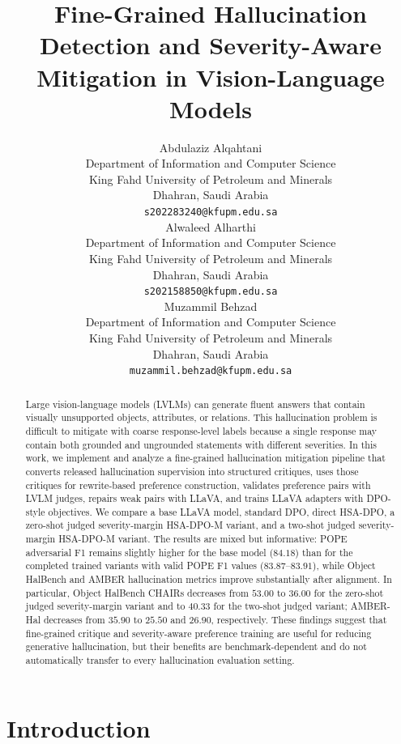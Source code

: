 \documentclass{article}
\title{Fine-Grained Hallucination Detection and Severity-Aware Mitigation in Vision-Language Models}
\author{%
  Abdulaziz Alqahtani\\
  Department of Information and Computer Science\\
  King Fahd University of Petroleum and Minerals\\
  Dhahran, Saudi Arabia\\
  \texttt{s202283240@kfupm.edu.sa}\\
  \And
  Alwaleed Alharthi\\
  Department of Information and Computer Science\\
  King Fahd University of Petroleum and Minerals\\
  Dhahran, Saudi Arabia\\
  \texttt{s202158850@kfupm.edu.sa}\\
  \And
  Muzammil Behzad\\
  Department of Information and Computer Science\\
  King Fahd University of Petroleum and Minerals\\
  Dhahran, Saudi Arabia\\
  \texttt{muzammil.behzad@kfupm.edu.sa}\\
}
\begin{document}
\maketitle

\begin{abstract}
Large vision-language models (LVLMs) can generate fluent answers that contain visually unsupported objects, attributes, or relations. This hallucination problem is difficult to mitigate with coarse response-level labels because a single response may contain both grounded and ungrounded statements with different severities. In this work, we implement and analyze a fine-grained hallucination mitigation pipeline that converts released hallucination supervision into structured critiques, uses those critiques for rewrite-based preference construction, validates preference pairs with LVLM judges, repairs weak pairs with LLaVA, and trains LLaVA adapters with DPO-style objectives. We compare a base LLaVA model, standard DPO, direct HSA-DPO, a zero-shot judged severity-margin HSA-DPO-M variant, and a two-shot judged severity-margin HSA-DPO-M variant. The results are mixed but informative: POPE adversarial F1 remains slightly higher for the base model ($84.18$) than for the completed trained variants with valid POPE F1 values ($83.87$--$83.91$), while Object HalBench and AMBER hallucination metrics improve substantially after alignment. In particular, Object HalBench CHAIRs decreases from $53.00$ to $36.00$ for the zero-shot judged severity-margin variant and to $40.33$ for the two-shot judged variant; AMBER-Hal decreases from $35.90$ to $25.50$ and $26.90$, respectively. These findings suggest that fine-grained critique and severity-aware preference training are useful for reducing generative hallucination, but their benefits are benchmark-dependent and do not automatically transfer to every hallucination evaluation setting.
\end{abstract}

\section{Introduction}
\end{document}
